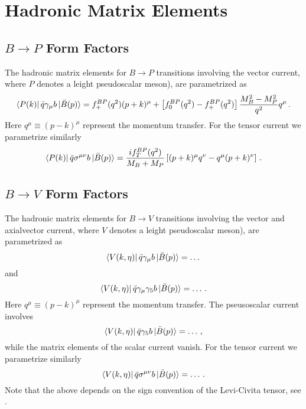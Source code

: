 \section{Hadronic Matrix Elements}
\label{sec:physics:b-mesons:hme}

\subsection{$B\to P$ Form Factors}
\label{sec:physics:b-mesons:hme:BtoP}

The hadronic matrix elements for $B\to P$ transitions involving
the vector current, where $P$ denotes a leight pseudoscalar meson), are parametrized as
\begin{equation}
\label{eq:physics:hme:BtoP-ff-V}
    \bra{P(k)} \bar{q} \gamma_\mu b \ket{\bar{B}(p)}
    = f^{BP}_+(q^2) (p + k)^\mu + \left[f^{BP}_0(q^2) - f^{BP}_+(q^2)\right] \frac{M_B^2 - M_P^2}{q^2} q^\mu\,.
\end{equation}
Here $q^\mu \equiv (p - k)^\mu$ represent the momentum transfer. For the tensor current
we parametrize similarly
\begin{equation}
\label{eq:physics:hme:BtoP-ff-T}
    \bra{P(k)} \bar{q} \sigma^{\mu\nu} b \ket{\bar{B}(p)}
    = \frac{i f^{BP}_T(q^2)}{M_B + M_P} \left[(p + k)^\mu q^\nu - q^\mu (p + k)^\nu\right]\,.
\end{equation}

\subsection{$B\to V$ Form Factors}
\label{physics:b-mesons:hme:BtoV}

The hadronic matrix elements for $B\to V$ transitions involving
the vector and axialvector current, where $V$ denotes a leight pseudoscalar meson), are parametrized as
\begin{equation}
\label{eq:physics:hme:BtoV-ff-V}
    \bra{V(k, \eta)} \bar{q} \gamma_\mu b \ket{\bar{B}(p)}
    = \dots
\end{equation}
and
\begin{equation}
\label{eq:physics:hme:BtoV-ff-A}
    \bra{V(k, \eta)} \bar{q} \gamma_\mu \gamma_5 b \ket{\bar{B}(p)}
    = \dots\,.
\end{equation}
Here $q^\mu \equiv (p - k)^\mu$ represent the momentum transfer. The pseusoscalar current involves
\begin{equation}
\label{eq:physics:hme:BtoV-ff-P}
    \bra{V(k, \eta)} \bar{q} \gamma_5 b \ket{\bar{B}(p)}
    = \dots\,,
\end{equation}
while the matrix elements of the scalar current vanish.
For the tensor current we parametrize similarly
\begin{equation}
\label{eq:physics:hme:BtoV-ff-T}
    \bra{V(k, \eta)} \bar{q} \sigma^{\mu\nu} b \ket{\bar{B}(p)}
    = \dots\,.
\end{equation}
Note that the above depends on the sign convention of the Levi-Civita tensor, see .

